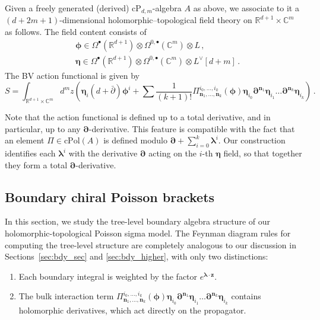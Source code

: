 \documentclass[11pt]{article}
\newcommand{\C}{\mathbb{C}}
\newcommand{\R}{\mathbb{R}}
\numberwithin{equation}{section}
\begin{document}
 Given a freely generated (derived) $\mathrm{cP}_{d,m}$-algebra $A$ as above, we associate to it a $(d+2m+1)$-dimensional holomorphic--topological field theory on $\R^{d+1}\times\C^{m}$ as follows. The field content consists of 
 \begin{equation}
\begin{aligned}
	 &\boldsymbol{\phi} \in \Omega^{\bullet}(\R^{d+1})\otimes \Omega^{0,\bullet}(\C^m)\otimes L\,,\\
	&\boldsymbol{\eta} \in \Omega^{\bullet}(\R^{d+1})\otimes \Omega^{0,\bullet}(\C^m)\otimes L^{\vee}[d+m]\,.
\end{aligned}
 \end{equation}
 The BV action functional is given by
 \begin{equation}
 	S= \int_{\R^{d+1}\times\C^{m}} d^mz \left( \boldsymbol{\eta}_i(d + \bar{\partial})\boldsymbol{\phi}^i + \sum\frac{1}{(k+1)!}\Pi^{i_0,\dots,i_{k}}_{\boldsymbol{n}_1,\dots,\boldsymbol{n}_{k}}(\boldsymbol{\phi})\boldsymbol{\eta}_{i_0}\boldsymbol{\partial}^{\boldsymbol{n}_1}\boldsymbol{\eta}_{i_1}\dots\boldsymbol{\partial}^{\boldsymbol{n}_{k}}\boldsymbol{\eta}_{i_{k}}\right)\,.
 \end{equation}
 
 Note that the action functional is defined up to a total derivative, and in particular, up to any $\boldsymbol{\partial}$-derivative. This feature is compatible with the fact that an element $\Pi \in \mathrm{cPol}(A)$ is defined modulo $\boldsymbol{\partial} + \sum_{i=0}^k \boldsymbol{\lambda}^i$. Our construction identifies each $\boldsymbol{\lambda}^i$ with the derivative $\boldsymbol{\partial}$ acting on the $i$-th $\boldsymbol{\eta}$ field, so that together they form a total $\boldsymbol{\partial}$-derivative.
 


 
 \subsection{Boundary chiral Poisson brackets}
 In this section, we study the tree-level boundary algebra structure of our holomorphic-topological Poisson sigma model. The Feynman diagram rules for computing the tree-level structure are completely analogous to our discussion in Sections~\ref{sec:bdy_sec} and \ref{sec:bdy_higher}, with only two distinctions:
 \begin{enumerate}
	\item Each boundary integral is weighted by the factor $e^{\boldsymbol{\lambda}\cdot\boldsymbol{z}}$.
	\item The bulk interaction term $\Pi^{i_0,\dots,i_{k}}_{\boldsymbol{n}_1,\dots,\boldsymbol{n}_{k}}(\boldsymbol{\phi})\boldsymbol{\eta}_{i_0}\boldsymbol{\partial}^{\boldsymbol{n}_1}\boldsymbol{\eta}_{i_1}\dots\boldsymbol{\partial}^{\boldsymbol{n}_{k}}\boldsymbol{\eta}_{i_{k}}$ contains holomorphic derivatives, which act directly on the propagator.
 \end{enumerate}
 
\end{document}
